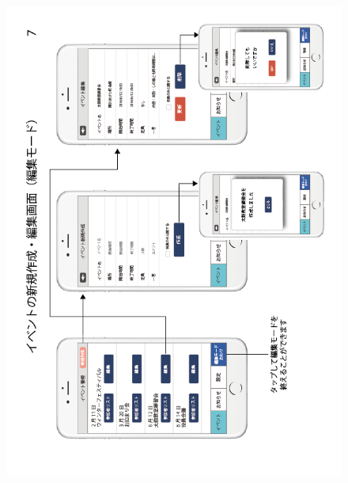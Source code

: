 \begin{figure}[ht]
    \begin{center}
      \includegraphics[keepaspectratio, scale=0.7]{appendixs/appendixB_figres/fig7.png}
    \end{center}
\end{figure}

